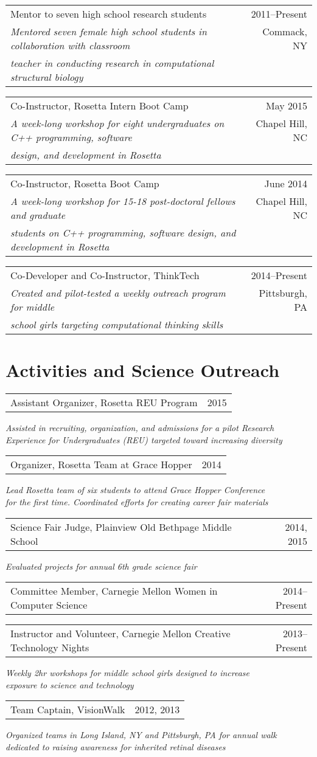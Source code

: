 \documentclass[12pt]{article}
\makeatletter
\newcommand{\allcapsspacing}[1]{{\addfontfeature{LetterSpace=7.5}#1}}
\newcommand{\threerowstwocolsitem}[5]{
\noindent
\begin{tabular*}{\textwidth}{@{\extracolsep{\fill}}lr}
		#1 & #2 \\
		#3 & #4 \\
		#5 & \\
\end{tabular*}\vspace{0.75\baselineskip}}
\newcommand{\longteachingitem}[5]{
\threerowstwocolsitem{#1}{#2}{\textit{#3}}{#5}{\textit{#4}}}
\newcommand{\leadershipitem}[3]{
\noindent
\begin{tabular*}{\textwidth}{@{\extracolsep{\fill}}lr}
		#1 & #2 \\
\end{tabular*}\newline\textit{#3}\vspace{0.75\baselineskip}\par}
\newcommand{\yearitem}[2]{
\noindent
\begin{tabular*}{\textwidth}{@{\extracolsep{\fill}}lr}
		#1 & #2 \\
\end{tabular*}\vspace{0.75\baselineskip}\par}
\makeatother
\begin{document}
\longteachingitem{Mentor to seven high school research students}{2011--Present}{Mentored seven female high school students in collaboration with classroom}{teacher in conducting research in computational structural biology}{Commack, NY}

\longteachingitem{Co-Instructor, Rosetta Intern Boot Camp}{May 2015}{A week-long workshop for eight undergraduates on C++ programming, software }{design, and development in Rosetta}{Chapel Hill, NC}

\longteachingitem{Co-Instructor, Rosetta Boot Camp}{June 2014}{A week-long workshop for 15-18 post-doctoral fellows and graduate}{students on C++ programming, software design, and development in Rosetta}{Chapel Hill, NC}

\longteachingitem{Co-Developer and Co-Instructor, ThinkTech}{2014--Present}{Created and pilot-tested a weekly outreach program for middle}{school girls targeting computational thinking skills}{Pittsburgh, PA}

\section*{\allcapsspacing{Activities and Science Outreach}}
\leadershipitem{Assistant Organizer, Rosetta REU Program}{2015}{Assisted in recruiting, organization, and admissions for a pilot Research \\ Experience for Undergraduates (REU) targeted toward increasing diversity}

\leadershipitem{Organizer, Rosetta Team at Grace Hopper}{2014}{Lead Rosetta team of six students to attend Grace Hopper Conference \\ for the first time. Coordinated efforts for creating career fair materials}

\leadershipitem{Science Fair Judge, Plainview Old Bethpage Middle School}{2014, 2015}{Evaluated projects for annual 6th grade science fair}

\yearitem{Committee Member, Carnegie Mellon Women in Computer Science}{2014--Present}

\leadershipitem{Instructor and Volunteer, Carnegie Mellon Creative Technology Nights}{2013--Present}{Weekly 2hr workshops for middle school girls designed to increase \\ exposure to science and technology}

\leadershipitem{Team Captain, VisionWalk}{2012, 2013}{Organized teams in Long Island, NY and Pittsburgh, PA for annual walk \\ dedicated to raising awareness for inherited retinal diseases}
\end{document}
